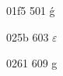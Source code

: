 \documentclass[11pt]{article}
\begin{document}

01f5 501 \'g







025b 603 \ensuremath{\varepsilon}

0261 609 g


























\end{document}
